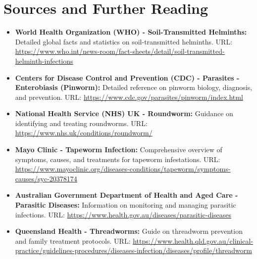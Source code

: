 \section*{Sources and Further Reading}
\begin{itemize}
    \item \textbf{World Health Organization (WHO) - Soil-Transmitted Helminths:} Detailed global facts and statistics on soil-transmitted helminths. URL: \url{https://www.who.int/news-room/fact-sheets/detail/soil-transmitted-helminth-infections}
    \item \textbf{Centers for Disease Control and Prevention (CDC) - Parasites - Enterobiasis (Pinworm):} Detailed reference on pinworm biology, diagnosis, and prevention. URL: \url{https://www.cdc.gov/parasites/pinworm/index.html}
    \item \textbf{National Health Service (NHS) UK - Roundworm:} Guidance on identifying and treating roundworms. URL: \url{https://www.nhs.uk/conditions/roundworm/}
    \item \textbf{Mayo Clinic - Tapeworm Infection:} Comprehensive overview of symptoms, causes, and treatments for tapeworm infestations. URL: \url{https://www.mayoclinic.org/diseases-conditions/tapeworm/symptoms-causes/syc-20378174}
    \item \textbf{Australian Government Department of Health and Aged Care - Parasitic Diseases:} Information on monitoring and managing parasitic infections. URL: \url{https://www.health.gov.au/diseases/parasitic-diseases}
    \item \textbf{Queensland Health - Threadworms:} Guide on threadworm prevention and family treatment protocols. URL: \url{https://www.health.qld.gov.au/clinical-practice/guidelines-procedures/diseases-infection/diseases/profile/threadworm}
\end{itemize}